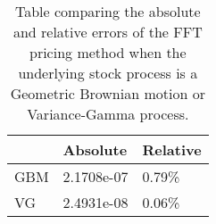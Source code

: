 \begin{table}[h]
\centering
\label{tab:err_table}
\begin{tabular}{lll}
\hline
\hline
{} &    \textbf{Absolute} & \textbf{Relative} \\
\hline
GBM &  2.1708e-07 &    0.79\% \\
VG  &  2.4931e-08 &    0.06\% \\
\hline
\end{tabular}
\caption{Table comparing the absolute and relative errors of the FFT pricing            method when the underlying stock process is a Geometric Brownian            motion or Variance-Gamma process.}
\end{table}
